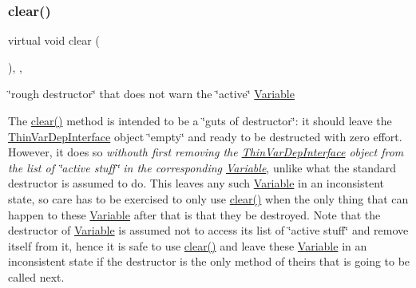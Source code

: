 \subsubsection{\texorpdfstring{clear()}{clear()}}
{\footnotesize\ttfamily virtual void clear (\begin{DoxyParamCaption}\item[{void}]{ }\end{DoxyParamCaption})\hspace{0.3cm}{\ttfamily [inline]}, {\ttfamily [override]}, {\ttfamily [virtual]}}



\char`\"{}rough destructor\char`\"{} that does not warn the \char`\"{}active\char`\"{} \mbox{\hyperlink{class_s_m_spp__di__unipi__it_1_1_variable}{Variable}} 

The \mbox{\hyperlink{class_s_m_spp__di__unipi__it_1_1_f_real_objective_a9862fdd31593937c218bbda548c85fcc}{clear()}} method is intended to be a \char`\"{}guts of destructor\char`\"{}\+: it should leave the \mbox{\hyperlink{class_s_m_spp__di__unipi__it_1_1_thin_var_dep_interface}{Thin\+Var\+Dep\+Interface}} object \char`\"{}empty\char`\"{} and ready to be destructed with zero effort. However, it does so {\itshape withouth first removing the \mbox{\hyperlink{class_s_m_spp__di__unipi__it_1_1_thin_var_dep_interface}{Thin\+Var\+Dep\+Interface}} object from the list of \char`\"{}active stuff\char`\"{} in the corresponding \mbox{\hyperlink{class_s_m_spp__di__unipi__it_1_1_variable}{Variable}}}, unlike what the standard destructor is assumed to do. This leaves any such \mbox{\hyperlink{class_s_m_spp__di__unipi__it_1_1_variable}{Variable}} in an inconsistent state, so care has to be exercised to only use \mbox{\hyperlink{class_s_m_spp__di__unipi__it_1_1_f_real_objective_a9862fdd31593937c218bbda548c85fcc}{clear()}} when the only thing that can happen to these \mbox{\hyperlink{class_s_m_spp__di__unipi__it_1_1_variable}{Variable}} after that is that they be destroyed. Note that the destructor of \mbox{\hyperlink{class_s_m_spp__di__unipi__it_1_1_variable}{Variable}} is assumed not to access its list of \char`\"{}active
stuff\char`\"{} and remove itself from it, hence it is safe to use \mbox{\hyperlink{class_s_m_spp__di__unipi__it_1_1_f_real_objective_a9862fdd31593937c218bbda548c85fcc}{clear()}} and leave these \mbox{\hyperlink{class_s_m_spp__di__unipi__it_1_1_variable}{Variable}} in an inconsistent state if the destructor is the only method of theirs that is going to be called next.

